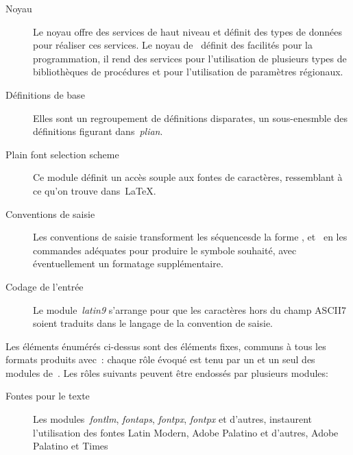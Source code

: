 \begin{description}

\item[Noyau]
Le noyau offre des services de haut niveau et définit des types de
données pour réaliser ces services. Le noyau de \brTeX\ définit des
facilités pour la programmation, il rend des services pour
l'utilisation de plusieurs types de bibliothèques de procédures et
pour l'utilisation de paramètres régionaux.

\item[Définitions de base]
Elles sont un regroupement de définitions disparates, un
sous-enesmble des définitions figurant dans~\emph{plian}.

\item[Plain font selection scheme]
Ce module définit un accès souple aux fontes de caractères,
ressemblant à ce qu'on trouve dans~\LaTeX.

\item[Conventions de saisie]
Les conventions de saisie transforment les séquencesde la
forme ,  et~ en
les commandes adéquates pour produire le symbole souhaité, avec
éventuellement un formatage supplémentaire.

\item[Codage de l'entrée]
Le module~\emph{latin9} s'arrange pour que les caractères hors du
champ ASCII7 soient traduits dans le langage de la convention
de saisie.

\end{description}

Les éléments énumérés ci-dessus sont des éléments fixes, communs à
tous les formats produits avec~\brTeX: chaque rôle évoqué est tenu par
un et un seul des modules de~\brTeX. Les rôles suivants peuvent être
endossés par plusieurs modules:

\begin{description}
\item[Fontes pour le texte]
Les modules~\emph{fontlm}, \emph{fontaps}, \emph{fontpx}, \emph{fontpx}
et d'autres, instaurent l'utilisation des fontes Latin Modern, Adobe
Palatino et d'autres, Adobe Palatino et Times
\item[]
\end{description}



